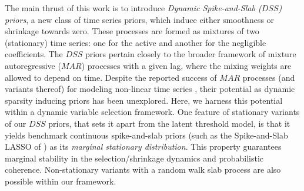 \documentclass[ba]{imsart}
\numberwithin{equation}{section}
\theoremstyle{plain}
\begin{document}
The main thrust of this work is to introduce {\sl Dynamic Spike-and-Slab ($DSS$) priors}, a new class of time series priors, which induce either smoothness or shrinkage towards zero. 
These processes are formed as mixtures of two (stationary) time series: one for the active  and {another} for the negligible coefficients. The $DSS$ priors pertain closely to the broader framework of mixture autoregressive ($MAR$) processes  with a given lag, where the mixing weights are allowed to depend on time. Despite the reported success of $MAR$ processes (and variants thereof)  for modeling non-linear time series \citep{wong_li, wong_li2, kalli, wood_kohn}, their potential as dynamic sparsity inducing priors has been unexplored. Here, we harness this potential within a dynamic variable selection framework. 
One feature of stationary variants of our $DSS$ priors, {that}  sets it apart from the latent threshold model, is that it yields  benchmark continuous spike-and-slab priors (such as the Spike-and-Slab LASSO of \cite{rockova15}) as its {\sl marginal stationary distribution}. This property guarantees marginal stability  in the selection/shrinkage dynamics and probabilistic coherence. {Non-stationary variants with a  random walk slab process are also possible within our framework.}
\end{document}

